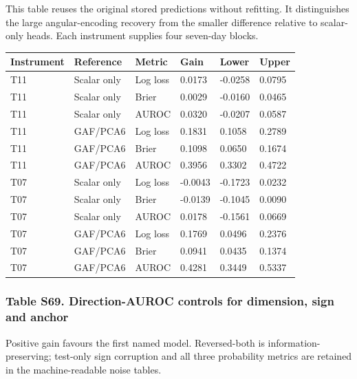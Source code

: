 \documentclass[a4paper,11pt]{article}
\newcounter{none}
\begin{document}
This table reuses the original stored predictions without refitting. It distinguishes the large angular-encoding recovery from the smaller difference relative to scalar-only heads. Each instrument supplies four seven-day blocks.

{\def\LTcaptype{none} %
\begin{longtable}[]{@{}llllll@{}}
\toprule\noalign{}
Instrument & Reference & Metric & Gain & Lower & Upper \\
\midrule\noalign{}
\endhead
\bottomrule\noalign{}
\endlastfoot
T11 & Scalar only & Log loss & 0.0173 & -0.0258 & 0.0795 \\
T11 & Scalar only & Brier & 0.0029 & -0.0160 & 0.0465 \\
T11 & Scalar only & AUROC & 0.0320 & -0.0207 & 0.0587 \\
T11 & GAF/PCA6 & Log loss & 0.1831 & 0.1058 & 0.2789 \\
T11 & GAF/PCA6 & Brier & 0.1098 & 0.0650 & 0.1674 \\
T11 & GAF/PCA6 & AUROC & 0.3956 & 0.3302 & 0.4722 \\
T07 & Scalar only & Log loss & -0.0043 & -0.1723 & 0.0232 \\
T07 & Scalar only & Brier & -0.0139 & -0.1045 & 0.0090 \\
T07 & Scalar only & AUROC & 0.0178 & -0.1561 & 0.0669 \\
T07 & GAF/PCA6 & Log loss & 0.1769 & 0.0496 & 0.2376 \\
T07 & GAF/PCA6 & Brier & 0.0941 & 0.0435 & 0.1374 \\
T07 & GAF/PCA6 & AUROC & 0.4281 & 0.3449 & 0.5337 \\
\end{longtable}
}

\subsubsection{Table S69. Direction-AUROC controls for dimension, sign and anchor}\label{table-s69.-direction-auroc-controls-for-dimension-sign-and-anchor}

Positive gain favours the first named model. Reversed-both is information-preserving; test-only sign corruption and all three probability metrics are retained in the machine-readable noise tables.
\end{document}
